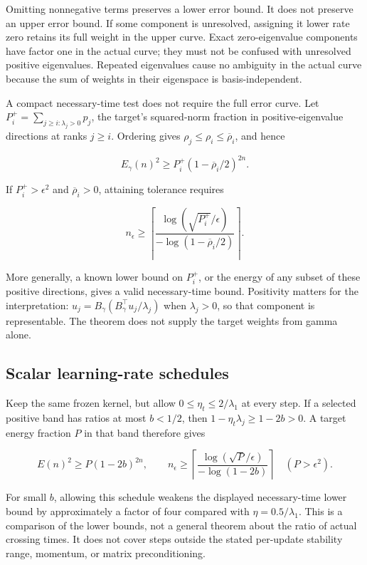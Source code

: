 \documentclass[11pt]{article}
\begin{document}
Omitting nonnegative terms preserves a lower error bound. It does not preserve an upper error bound. If some component is unresolved, assigning it lower rate zero retains its full weight in the upper curve. Exact zero-eigenvalue components have factor one in the actual curve; they must not be confused with unresolved positive eigenvalues. Repeated eigenvalues cause no ambiguity in the actual curve because the sum of weights in their eigenspace is basis-independent.

A compact necessary-time test does not require the full error curve. Let \(P_i^+=\sum_{j\ge i:\lambda_j>0}p_j\), the target's squared-norm fraction in positive-eigenvalue directions at ranks \(j\ge i\). Ordering gives \(\rho_j\le\rho_i\le\overline\rho_i\), and hence

\[
E_\gamma(n)^2\ge P_i^+(1-\overline\rho_i/2)^{2n}.
\]

If \(P_i^+>\epsilon^2\) and \(\overline\rho_i>0\), attaining tolerance requires

\[
n_\epsilon\ge
\left\lceil
\frac{\log(\sqrt{P_i^+}/\epsilon)}{-\log(1-\overline\rho_i/2)}
\right\rceil.
\tag{E1}
\]

More generally, a known lower bound on \(P_i^+\), or the energy of any subset of these positive directions, gives a valid necessary-time bound. Positivity matters for the interpretation: \(u_j=B_\gamma(B_\gamma^\top u_j/\lambda_j)\) when \(\lambda_j>0\), so that component is representable. The theorem does not supply the target weights from gamma alone.

\subsection{Scalar learning-rate schedules}

Keep the same frozen kernel, but allow \(0\le\eta_t\le2/\lambda_1\) at every step. If a selected positive band has ratios at most \(b<1/2\), then \(1-\eta_t\lambda_j\ge1-2b>0\). A target energy fraction \(P\) in that band therefore gives

\[
E(n)^2\ge P(1-2b)^{2n},
\qquad
n_\epsilon\ge
\left\lceil\frac{\log(\sqrt P/\epsilon)}{-\log(1-2b)}\right\rceil
\quad(P>\epsilon^2).
\]

For small \(b\), allowing this schedule weakens the displayed necessary-time lower bound by approximately a factor of four compared with \(\eta=0.5/\lambda_1\). This is a comparison of the lower bounds, not a general theorem about the ratio of actual crossing times. It does not cover steps outside the stated per-update stability range, momentum, or matrix preconditioning.
\end{document}
